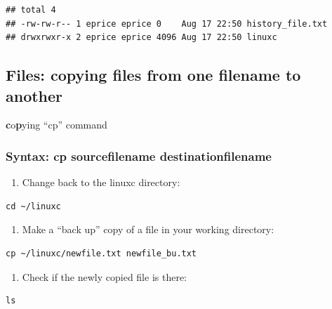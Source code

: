 \documentclass[
]{book}
\providecommand{\tightlist}{%
  \setlength{\itemsep}{0pt}\setlength{\parskip}{0pt}}
\begin{document}
\begin{verbatim}
## total 4
## -rw-rw-r-- 1 eprice eprice 0    Aug 17 22:50 history_file.txt 
## drwxrwxr-x 2 eprice eprice 4096 Aug 17 22:50 linuxc
\end{verbatim}

\hypertarget{files-copying-files-from-one-filename-to-another}{%
\subsection{Files: copying files from one filename to another}\label{files-copying-files-from-one-filename-to-another}}

\textbf{c}o\textbf{p}ying ``cp'' command

\hypertarget{syntax-cp-sourcefilename-destinationfilename}{%
\subsubsection*{Syntax: cp sourcefilename destinationfilename}\label{syntax-cp-sourcefilename-destinationfilename}}

\begin{enumerate}
\def\labelenumi{\arabic{enumi})}
\tightlist
\item
  Change back to the linuxc directory:
\end{enumerate}

\begin{verbatim}
cd ~/linuxc
\end{verbatim}

\begin{enumerate}
\def\labelenumi{\arabic{enumi})}
\setcounter{enumi}{1}
\tightlist
\item
  Make a ``back up'' copy of a file in your working directory:
\end{enumerate}

\begin{verbatim}
cp ~/linuxc/newfile.txt newfile_bu.txt
\end{verbatim}

\begin{enumerate}
\def\labelenumi{\arabic{enumi})}
\setcounter{enumi}{2}
\tightlist
\item
  Check if the newly copied file is there:
\end{enumerate}

\begin{verbatim}
ls
\end{verbatim}
\end{document}
